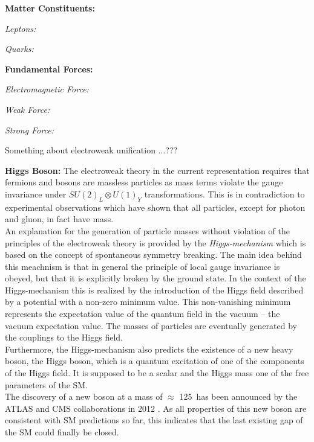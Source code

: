 \begin{description}

\item \textbf{Matter Constituents:}
 \begin{description}
  \item \textit{Leptons:}
  \item \textit{Quarks:}
 \end{description}

\item \textbf{Fundamental Forces:}
 \begin{description}
  \item \textit{Electromagnetic Force:}
  \item \textit{Weak Force:}
  \item \textit{Strong Force:}
 \end{description}
Something about electroweak unification ...???
\item \textbf{Higgs Boson:} The electroweak theory in the current representation requires that fermions and bosons are massless particles as mass terms violate the gauge invariance under $SU(2)_{L} \otimes U(1)_{Y}$ transformations. This is in contradiction to experimental observations which have shown that all particles, except for photon and gluon, in fact have mass. \\
An explanation for the generation of particle masses without violation of the principles of the electroweak theory is provided by the \textit{Higgs-mechanism}  which is based on the concept of spontaneous symmetry breaking. The main idea behind this meachnism is that in general the principle of local gauge invariance is obeyed, but that it is explicitly broken by the ground state. In the context of the Higgs-mechanism this is realized by the introduction of the Higgs field described by a potential with a non-zero minimum value. This non-vanishing minimum represents the expectation value of the quantum field in the vacuum -- the vacuum expectation value. The masses of particles are eventually generated by the couplings to the Higgs field. \\
Furthermore, the Higgs-mechanism also predicts the existence of a new heavy boson, the Higgs boson, which is a quantum excitation of one of the components of the Higgs field. It is supposed to be a scalar and the Higgs mass one of the free parameters of the SM. \\
The discovery of a new boson at a mass of $\approx$ 125~\gev has been announced by the ATLAS and CMS collaborations in 2012 . As all properties of this new boson are consistent with SM predictions so far, this indicates that the last existing gap of the SM could finally be closed. 

\end{description}


